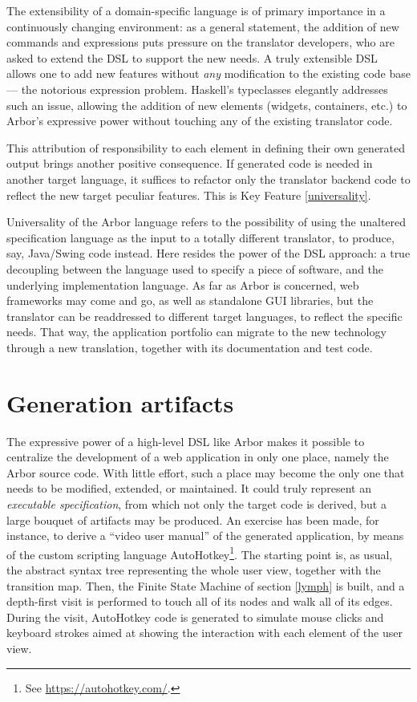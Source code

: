 \documentclass[12pt]{article} %
\newcommand{\dsl}{domain-specific language}
\newcommand{\DSL}{DSL}
\newcommand{\abs}{abstract syntax tree}
\newcommand{\A}{Arbor}
\newcommand{\Hs}{Haskell}
\newcommand{\q}[1]{``#1''}
\newcounter{kfcounter}
\newenvironment{kfe}[2]
	{\refstepcounter{kfcounter}\begin{tcolorbox}[enhanced,colframe=blue!50!black,colback=blue!10!white,title=Key Feature \thekfcounter: \emph{#1}\label{#2},lifted shadow={1mm}{-2mm}{3mm}{0.1mm}{black!50!white},fonttitle=\bfseries]}
	{\end{tcolorbox}}
\begin{document}
\begin{kfe}{Extensibility}{extensibility}
The extensibility of a \dsl{} is of primary importance in a continuously changing environment: as a general statement, the addition of new commands and expressions puts pressure on the translator developers, who are asked to extend the \DSL{} to support the new needs. A truly extensible \DSL{} allows one to add new features without \emph{any} modification to the existing code base --- the notorious expression problem\cite{reyn}. \Hs{}'s typeclasses elegantly addresses such an issue, allowing the addition of new elements (widgets, containers, etc.) to \A{}'s expressive power without touching any of the existing translator code.
\end{kfe}
This attribution of responsibility to each element in defining their own generated output brings another positive consequence. If generated code is needed in another target language, it suffices to refactor only the translator backend code to reflect the new target peculiar features. This is Key Feature \ref{universality}.\\
\begin{kfe}{Universality}{universality}
Universality of the \A{} language refers to the possibility of using the unaltered specification language as the input to a totally different translator, to produce, say, Java/Swing code instead. Here resides the power of the \DSL{} approach: a true decoupling between the language used to specify a piece of software, and the underlying implementation language. As far as \A{} is concerned, web frameworks may come and go, as well as standalone GUI libraries, but the translator can be readdressed to different target languages, to reflect the specific needs. That way, the application portfolio can migrate to the new technology through a new translation, together with its documentation and test code.
\end{kfe}

\section{Generation artifacts}
The expressive power of a high-level \DSL{} like \A{} makes it possible to centralize the development of a web application in only one place, namely the \A{} source code. With little effort, such a place may become the only one that needs to be modified, extended, or maintained. It could truly represent an \emph{executable specification}, from which not only the target code is derived, but a large bouquet of artifacts may be produced. An exercise has been made, for instance, to derive a \q{video user manual} of the generated application, by means of the custom scripting language AutoHotkey\footnote{See \scriptsize\url{https://autohotkey.com/}.}. The starting point is, as usual,  the \abs{} representing the whole user view, together with the transition map. Then, the Finite State Machine of section \ref{lymph} is built, and a depth-first visit is performed to touch all of its nodes and walk all of its edges. During the visit, AutoHotkey code is generated to simulate mouse clicks and keyboard strokes aimed at showing the interaction with each element of the user view. 
\end{document}
